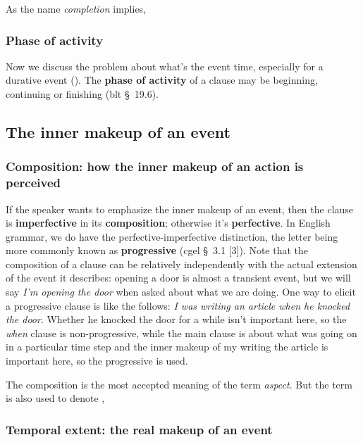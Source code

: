 \documentclass[UTF8, a4paper, oneside, scheme=plain]{ctexart}
\newcommand*{\citesec}[1]{\S~{#1}}
\newcommand*{\concept}[1]{\textbf{#1}}
\newcommand*{\term}[1]{\emph{#1}}
\newcommand*{\corpus}[1]{\emph{#1}}
\begin{document}
As the name \term{completion} implies,


\subsubsection{Phase of activity}\label{sec:phase-of-activity}

Now we discuss the problem about what's the event time,
especially for a durative event ().
The \concept{phase of activity} of a clause 
may be beginning, continuing or finishing (\ac{blt} \citesec{19.6}).


\subsection{The inner makeup of an event}\label{sec:inner-make-up-event}

\subsubsection{Composition: how the inner makeup of an action is perceived}\label{sec:composition}

If the speaker wants to emphasize the inner makeup of an event,
then the clause is \concept{imperfective} in its \concept{composition};
otherwise it's \concept{perfective}.
In English grammar, 
we do have the perfective-imperfective distinction,
the letter being more commonly known as \concept{progressive}
(\ac{cgel} \citesec{3.1} [3]).
Note that the composition of a clause can be relatively independently 
with the actual extension of the event it describes:
opening a door is almost a transient event,
but we will say \corpus{I'm opening the door} when asked about what we are doing.
One way to elicit a progressive clause is like the follows:
\corpus{I was writing an article when he knocked the door}.
Whether he knocked the door for a while isn't important here,
so the \corpus{when} clause is non-progressive,
while the main clause is about what was going on in a particular time step
and the inner makeup of my writing the article is important here,
so the progressive is used.

The composition is the most accepted meaning of the term \term{aspect}.
But the term is also used to denote 
, 

\subsubsection{Temporal extent: the real makeup of an event}
\end{document}
